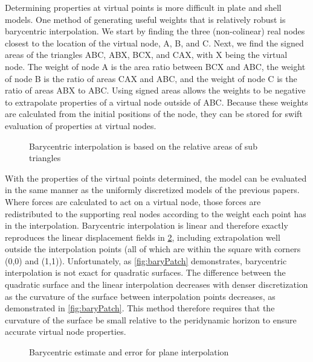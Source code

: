 Determining properties at virtual points is more difficult in plate and shell models.
One method of generating useful weights that is relatively robust is barycentric interpolation.
We start by finding the three (non-colinear) real nodes closest to the location of the virtual node, A, B, and C.
Next, we find the signed areas of the triangles ABC, ABX, BCX, and CAX, with X being the virtual node.
The weight of node A is the area ratio between BCX and ABC, the weight of node B is the ratio of areas CAX and ABC, and the weight of node C is the ratio of areas ABX to ABC.
Using signed areas allows the weights to be negative to extrapolate properties of a virtual node outside of ABC.
Because these weights are calculated from the initial positions of the node, they can be stored for swift evaluation of properties at virtual nodes.

%
\begin{figure}[htbp]
  \vspace{10mm}
  \centering
  \resizebox{0.4\linewidth}{!}{}
  \caption{Barycentric interpolation is based on the relative areas of sub triangles}
  \label{fig:BaryCentric}
\end{figure}
%

With the properties of the virtual points determined, the model can be evaluated in the same manner as the uniformly discretized models of the previous papers.
Where forces are calculated to act on a virtual node, those forces are redistributed to the supporting real nodes according to the weight each point has in the interpolation.
Barycentric interpolation is linear and therefore exactly reproduces the linear displacement fields in \cref{fig:barycentric}, including extrapolation well outside the interpolation points (all of which are within the square with corners (0,0) and (1,1)).
Unfortunately, as \cref{fig:baryPatch} demonstrates, barycentric interpolation is not exact for quadratic surfaces.
The difference between the quadratic surface and the linear interpolation decreases with denser discretization as the curvature of the surface between interpolation points decreases, as demonstrated in \cref{fig:baryPatch}.
This method therefore requires that the curvature of the surface be small relative to the peridynamic horizon to ensure accurate virtual node properties.

\begin{figure}[htbp]
  \centering
  \resizebox{0.8\linewidth}{!}{}
  \caption{Barycentric estimate and error for plane interpolation}
  \label{fig:barycentric}
\end{figure}

